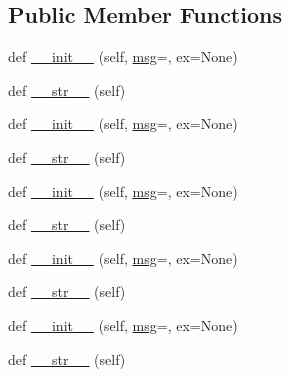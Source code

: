 \subsection*{Public Member Functions}
\begin{DoxyCompactItemize}
\item 
def \hyperlink{classwaflib_1_1_errors_1_1_waf_error_a6ca7563068e98745fce92d6da8d5f78d}{\+\_\+\+\_\+init\+\_\+\+\_\+} (self, \hyperlink{classwaflib_1_1_errors_1_1_waf_error_a56b836e4e618bbe57e74e363480c093b}{msg}=\textquotesingle{}\textquotesingle{}, ex=None)
\item 
def \hyperlink{classwaflib_1_1_errors_1_1_waf_error_adc581829bbd84e357645fd02ce7b8649}{\+\_\+\+\_\+str\+\_\+\+\_\+} (self)
\item 
def \hyperlink{classwaflib_1_1_errors_1_1_waf_error_a6ca7563068e98745fce92d6da8d5f78d}{\+\_\+\+\_\+init\+\_\+\+\_\+} (self, \hyperlink{classwaflib_1_1_errors_1_1_waf_error_a56b836e4e618bbe57e74e363480c093b}{msg}=\textquotesingle{}\textquotesingle{}, ex=None)
\item 
def \hyperlink{classwaflib_1_1_errors_1_1_waf_error_adc581829bbd84e357645fd02ce7b8649}{\+\_\+\+\_\+str\+\_\+\+\_\+} (self)
\item 
def \hyperlink{classwaflib_1_1_errors_1_1_waf_error_a6ca7563068e98745fce92d6da8d5f78d}{\+\_\+\+\_\+init\+\_\+\+\_\+} (self, \hyperlink{classwaflib_1_1_errors_1_1_waf_error_a56b836e4e618bbe57e74e363480c093b}{msg}=\textquotesingle{}\textquotesingle{}, ex=None)
\item 
def \hyperlink{classwaflib_1_1_errors_1_1_waf_error_adc581829bbd84e357645fd02ce7b8649}{\+\_\+\+\_\+str\+\_\+\+\_\+} (self)
\item 
def \hyperlink{classwaflib_1_1_errors_1_1_waf_error_a6ca7563068e98745fce92d6da8d5f78d}{\+\_\+\+\_\+init\+\_\+\+\_\+} (self, \hyperlink{classwaflib_1_1_errors_1_1_waf_error_a56b836e4e618bbe57e74e363480c093b}{msg}=\textquotesingle{}\textquotesingle{}, ex=None)
\item 
def \hyperlink{classwaflib_1_1_errors_1_1_waf_error_adc581829bbd84e357645fd02ce7b8649}{\+\_\+\+\_\+str\+\_\+\+\_\+} (self)
\item 
def \hyperlink{classwaflib_1_1_errors_1_1_waf_error_a6ca7563068e98745fce92d6da8d5f78d}{\+\_\+\+\_\+init\+\_\+\+\_\+} (self, \hyperlink{classwaflib_1_1_errors_1_1_waf_error_a56b836e4e618bbe57e74e363480c093b}{msg}=\textquotesingle{}\textquotesingle{}, ex=None)
\item 
def \hyperlink{classwaflib_1_1_errors_1_1_waf_error_adc581829bbd84e357645fd02ce7b8649}{\+\_\+\+\_\+str\+\_\+\+\_\+} (self)

\end{DoxyCompactItemize}
